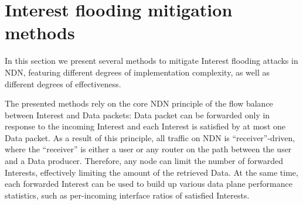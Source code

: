 \section{Interest flooding mitigation methods}
\label{sec:design}



In this section we present several methods to mitigate Interest flooding attacks in NDN, featuring different degrees of implementation complexity, as well as different degrees of effectiveness.

The presented methods rely on the core NDN principle of the flow balance between Interest and Data packets: Data packet can be forwarded only in response to the incoming Interest and each Interest is satisfied by at most one Data packet.
As a result of this principle, all traffic on NDN is ``receiver''-driven, where the ``receiver'' is either a user or any router on the path between the user and a Data producer.
Therefore, any node can limit the number of forwarded Interests, effectively limiting the amount of the retrieved Data.
At the same time, each forwarded Interest can be used to build up various data plane performance statistics, such as per-incoming interface ratios of satisfied Interests.



















